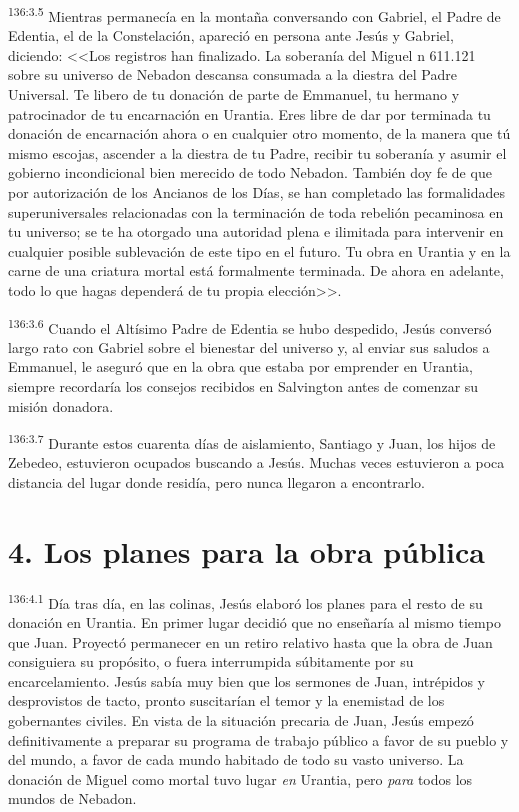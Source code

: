 \par 
\textsuperscript{136:3.5} Mientras permanecía en la montaña conversando con Gabriel, el Padre de Edentia, el de la Constelación, apareció en persona ante Jesús y Gabriel, diciendo: <<Los registros han finalizado. La soberanía del Miguel n{\textordmasculine} 611.121 sobre su universo de Nebadon descansa consumada a la diestra del Padre Universal. Te libero de tu donación de parte de Emmanuel, tu hermano y patrocinador de tu encarnación en Urantia. Eres libre de dar por terminada tu donación de encarnación ahora o en cualquier otro momento, de la manera que tú mismo escojas, ascender a la diestra de tu Padre, recibir tu soberanía y asumir el gobierno incondicional bien merecido de todo Nebadon. También doy fe de que por autorización de los Ancianos de los Días, se han completado las formalidades superuniversales relacionadas con la terminación de toda rebelión pecaminosa en tu universo; se te ha otorgado una autoridad plena e ilimitada para intervenir en cualquier posible sublevación de este tipo en el futuro. Tu obra en Urantia y en la carne de una criatura mortal está formalmente terminada. De ahora en adelante, todo lo que hagas dependerá de tu propia elección>>.

\par 
\textsuperscript{136:3.6} Cuando el Altísimo Padre de Edentia se hubo despedido, Jesús conversó largo rato con Gabriel sobre el bienestar del universo y, al enviar sus saludos a Emmanuel, le aseguró que en la obra que estaba por emprender en Urantia, siempre recordaría los consejos recibidos en Salvington antes de comenzar su misión donadora.

\par 
\textsuperscript{136:3.7} Durante estos cuarenta días de aislamiento, Santiago y Juan, los hijos de Zebedeo, estuvieron ocupados buscando a Jesús. Muchas veces estuvieron a poca distancia del lugar donde residía, pero nunca llegaron a encontrarlo.

\section*{4. Los planes para la obra pública}
\par 
\textsuperscript{136:4.1} Día tras día, en las colinas, Jesús elaboró los planes para el resto de su donación en Urantia. En primer lugar decidió que no enseñaría al mismo tiempo que Juan. Proyectó permanecer en un retiro relativo hasta que la obra de Juan consiguiera su propósito, o fuera interrumpida súbitamente por su encarcelamiento. Jesús sabía muy bien que los sermones de Juan, intrépidos y desprovistos de tacto, pronto suscitarían el temor y la enemistad de los gobernantes civiles. En vista de la situación precaria de Juan, Jesús empezó definitivamente a preparar su programa de trabajo público a favor de su pueblo y del mundo, a favor de cada mundo habitado de todo su vasto universo. La donación de Miguel como mortal tuvo lugar \textit{en} Urantia, pero \textit{para} todos los mundos de Nebadon.

